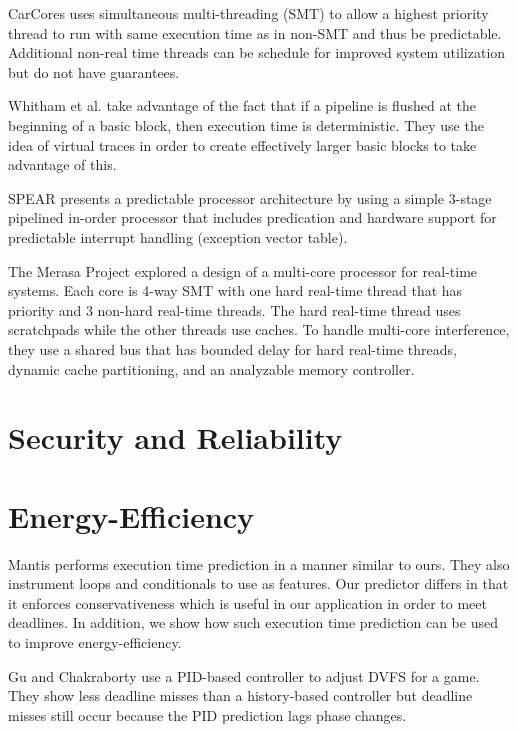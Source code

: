 CarCores \cite{carcores-arcs10} uses simultaneous multi-threading (SMT) to
allow a highest priority thread to run with same execution time as in non-SMT
and thus be predictable. Additional non-real time threads can be schedule for
improved system utilization but do not have guarantees.


Whitham et al. \cite{whitham-comp10} take advantage of the fact that if a
pipeline is flushed at the beginning of a basic block, then execution time is
deterministic. They use the idea of virtual traces in order to create
effectively larger basic blocks to take advantage of this.

SPEAR \cite{spear-ecrts03} presents a predictable processor architecture by
using a simple 3-stage pipelined in-order processor that includes predication
and hardware support for predictable interrupt handling (exception vector
table).

The Merasa Project \cite{merasa-micro10} explored a design of a multi-core
processor for real-time systems. Each core is 4-way SMT with one hard real-time
thread that has priority and 3 non-hard real-time threads. The hard real-time
thread uses scratchpads while the other threads use caches. To handle
multi-core interference, they use a shared bus that has bounded delay for hard
real-time threads, dynamic cache partitioning, and an analyzable memory
controller.

\section{Security and Reliability}
\label{sec:related_work.security}

\section{Energy-Efficiency}
\label{sec:related_work.energy}

Mantis \cite{mantis-atc13} performs execution time prediction in a manner
similar to ours. They also instrument loops and conditionals to use as
features. Our predictor differs in that it enforces conservativeness which is
useful in our application in order to meet deadlines. In addition, we show how
such execution time prediction can be used to improve energy-efficiency.

Gu and Chakraborty \cite{gu-dac08} use a PID-based controller to adjust DVFS
for a game. They show less deadline misses than a history-based controller but
deadline misses still occur because the PID prediction lags phase changes.

